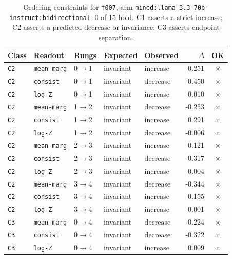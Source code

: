 \documentclass[11pt]{article}
\begin{document}
\begin{table}[htbp]
\centering
\small
\caption{Ordering constraints for \texttt{f007}, arm \texttt{mined:llama-3.3-70b-instruct:bidirectional}: 0 of 15 hold. C1 asserts a strict increase; C2 asserts a predicted decrease or invariance; C3 asserts endpoint separation.}
\label{tab:ladder-f007-mined-llama-3-3-70b-instruct-bidirectional}
\begin{tabular}{lllllrc}
\toprule
Class & Readout & Rungs & Expected & Observed & $\Delta$ & OK \\
\midrule
\texttt{C2} & \texttt{mean-marg} & 0$\to$1 & invariant & increase & 0.251 & $\times$ \\
\texttt{C2} & \texttt{consist} & 0$\to$1 & invariant & decrease & -0.450 & $\times$ \\
\texttt{C2} & \texttt{log-Z} & 0$\to$1 & invariant & increase & 0.010 & $\times$ \\
\texttt{C2} & \texttt{mean-marg} & 1$\to$2 & invariant & decrease & -0.253 & $\times$ \\
\texttt{C2} & \texttt{consist} & 1$\to$2 & invariant & increase & 0.291 & $\times$ \\
\texttt{C2} & \texttt{log-Z} & 1$\to$2 & invariant & decrease & -0.006 & $\times$ \\
\texttt{C2} & \texttt{mean-marg} & 2$\to$3 & invariant & increase & 0.121 & $\times$ \\
\texttt{C2} & \texttt{consist} & 2$\to$3 & invariant & decrease & -0.317 & $\times$ \\
\texttt{C2} & \texttt{log-Z} & 2$\to$3 & invariant & increase & 0.004 & $\times$ \\
\texttt{C2} & \texttt{mean-marg} & 3$\to$4 & invariant & decrease & -0.344 & $\times$ \\
\texttt{C2} & \texttt{consist} & 3$\to$4 & invariant & increase & 0.155 & $\times$ \\
\texttt{C2} & \texttt{log-Z} & 3$\to$4 & invariant & increase & 0.001 & $\times$ \\
\texttt{C3} & \texttt{mean-marg} & 0$\to$4 & invariant & decrease & -0.224 & $\times$ \\
\texttt{C3} & \texttt{consist} & 0$\to$4 & invariant & decrease & -0.322 & $\times$ \\
\texttt{C3} & \texttt{log-Z} & 0$\to$4 & invariant & increase & 0.009 & $\times$ \\
\bottomrule
\end{tabular}
\end{table}
\end{document}
